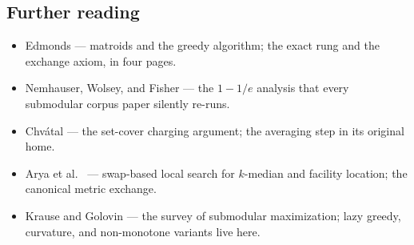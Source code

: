 \subsection{Further reading}

\begin{itemize}
\item Edmonds \citep{exchange-greedy-bg1} --- matroids and the greedy algorithm; the
  exact rung and the exchange axiom, in four pages.
\item Nemhauser, Wolsey, and Fisher \citep{exchange-greedy-bg2} --- the $1-1/e$
  analysis that every submodular corpus paper silently re-runs.
\item Chv\'atal \citep{exchange-greedy-bg3} --- the set-cover charging argument; the
  averaging step in its original home.
\item Arya et al.\ \citep{exchange-greedy-bg4} --- swap-based local search for
  $k$-median and facility location; the canonical metric exchange.
\item Krause and Golovin \citep{exchange-greedy-bg5} --- the survey of submodular
  maximization; lazy greedy, curvature, and non-monotone variants live here.
\end{itemize}

